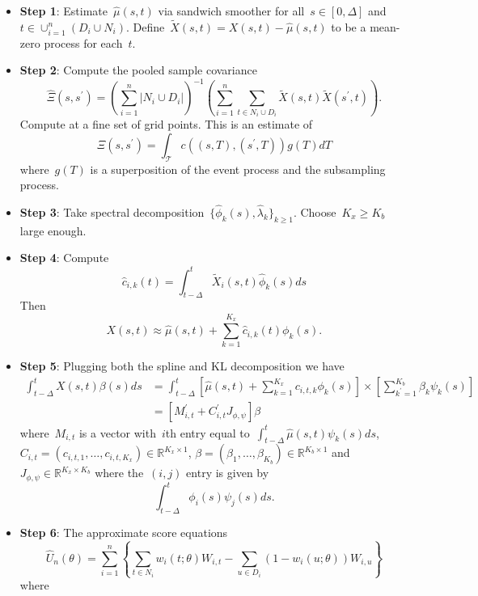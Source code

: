 \documentclass[11pt]{amsart}
\begin{document}
\begin{itemize}
\item {\bf Step 1}: Estimate~$\hat \mu(s,t)$ via sandwich smoother for
  all~$s \in [0,\Delta]$ and~$t \in \cup_{i=1}^n \left( D_i \cup N_i
  \right)$. Define~$\tilde X (s,t) = X(s,t) - \hat \mu(s,t)$ to be a
  mean-zero process for each~$t$.
\item {\bf Step 2}: Compute the pooled sample covariance
\[
\hat \Xi (s , s^\prime) = 
\left( \sum_{i=1}^n \left | N_i \cup D_i \right |\right)^{-1}
\left( \sum_{i=1}^n \sum_{t \in N_i \cup D_i} \tilde X (s,t) \tilde X
  (s^\prime, t) \right).
\]
Compute at a fine set of grid points. This is an estimate of 
\[
\Xi (s, s^\prime) = \int_{\mathcal{T}} c( (s,T), (s^\prime, T) ) g(T) dT
\]
where~$g(T)$ is a superposition of the event process and the
subsampling process.
\item {\bf Step 3}: Take spectral decomposition~$\{ \hat \phi_k (s),
  \hat \lambda_k \}_{k \geq 1}$. Choose~$K_x \geq K_b$ large enough.
\item {\bf Step 4}: Compute
\[
\hat c_{i,k} (t) = \int_{t-\Delta}^t \tilde X_i (s,t) \hat \phi_k (s) ds
\]
Then
\[
X(s,t) \approx \hat \mu(s,t) + \sum_{k=1}^{K_x} \hat c_{i,k} (t)
\phi_k (s).
\]
\item {\bf Step 5}: Plugging both the spline and KL decomposition we
  have
\begin{align*}
\int_{t-\Delta}^t X(s,t) \beta(s) ds 
  &= \int_{t-\Delta}^t \left[ \hat \mu(s,t) + \sum_{k=1}^{K_x}
    c_{i,t,k} \phi_k (s) \right] \times \left[ \sum_{k^\prime=1}^{K_b}
    \beta_k \psi_k (s) \right] \\
  &= [ M_{i,t}^\prime + C_{i,t}^\prime J_{\phi, \psi} ] \beta
\end{align*}
where~$M_{i,t}$ is a vector with~$i$th entry equal
to~$\int_{t-\Delta}^t \hat \mu(s,t) \psi_k (s) ds$, $C_{i,t} =
(c_{i,t,1}, \ldots, c_{i,t,K_x}) \in \mathbb{R}^{K_x \times 1}$,
$\beta = (\beta_1, \ldots, \beta_{K_b}) \in \mathbb{R}^{K_b \times 1}$
and~$J_{\phi, \psi} \in \mathbb{R}^{K_x \times K_b}$ where the~$(i,j)$
entry is given by
\[
\int_{t-\Delta}^t \phi_{i} (s) \psi_{j} (s) ds.
\]
\item {\bf Step 6}: The approximate score equations
\begin{equation}
\label{eq:weighted_esteq}
\hat U_n (\theta) = \sum_{i=1}^n \left \{ \sum_{t \in N_i} w_{i} (t; \theta) W_{i,t} -
    \sum_{u \in D_i} (1 - w_i (u; \theta)) W_{i,u} \right \} 
\end{equation}
where
\begin{equation}

\end{equation}
\end{itemize}
\end{document}
